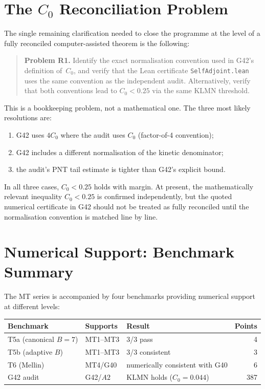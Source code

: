 \documentclass[11pt,a4paper]{article}
\begin{document}
\section{The $C_0$ Reconciliation Problem}

The single remaining clarification needed to close the programme at the level of a fully reconciled computer-assisted theorem is the following:

\begin{quote}
\textbf{Problem R1.}  Identify the exact normalisation convention used in G42's definition of~$C_0$, and verify that the Lean certificate \texttt{SelfAdjoint.lean} uses the same convention as the independent audit.  Alternatively, verify that both conventions lead to $C_0<0.25$ via the same KLMN threshold.
\end{quote}

This is a bookkeeping problem, not a mathematical one.  The three most likely resolutions are:
\begin{enumerate}[nosep]
    \item G42 uses $4C_0$ where the audit uses $C_0$ (factor-of-4 convention);
    \item G42 includes a different normalisation of the kinetic denominator;
    \item the audit's PNT tail estimate is tighter than G42's explicit bound.
\end{enumerate}
In all three cases, $C_0<0.25$ holds with margin.  At present, the mathematically relevant inequality $C_0<0.25$ is confirmed independently, but the quoted numerical certificate in G42 should not be treated as fully reconciled until the normalisation convention is matched line by line.

\section{Numerical Support: Benchmark Summary}

The MT series is accompanied by four benchmarks providing numerical support at different levels:

\begin{center}
\begin{tabular}{@{}lllr@{}}
\toprule
\textbf{Benchmark} & \textbf{Supports} & \textbf{Result} & \textbf{Points} \\
\midrule
T5a (canonical $B\!=\!7$) & MT1--MT3 & 3/3 pass & 4 \\
T5b (adaptive $B$) & MT1--MT3 & 3/3 consistent & 3 \\
T6 (Mellin) & MT4/G40 & numerically consistent with G40 & 6 \\
G42 audit & G42/$A2$ & KLMN holds ($C_0\!=\!0.044$) & 387 \\
\bottomrule
\end{tabular}
\end{center}
\end{document}
